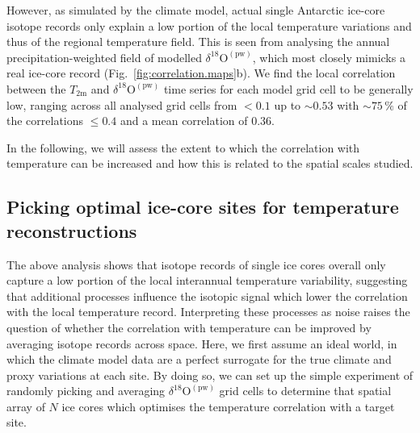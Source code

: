 \documentclass[cp, manuscript]{copernicus}
\begin{document}
However, as simulated by the climate model, actual single Antarctic ice-core
isotope records only explain a low portion of the local temperature variations
and thus of the regional temperature field. This is seen from analysing the
annual precipitation-weighted field of modelled
$\delta^{18}\mathrm{O}^{\mathrm{(pw)}}$, which most closely mimicks a real
ice-core record (Fig.~\ref{fig:correlation.maps}b). We find the local
correlation between the $T_{2\mathrm{m}}$ and
$\delta^{18}\mathrm{O}^{\mathrm{(pw)}}$ time series for each model grid cell to
be generally low, ranging across all analysed grid cells from $<0.1$ up to
$\sim0.53$ with $\sim75\,\%$ of the correlations $\leq0.4$ and a mean
correlation of $0.36$.

In the following, we will assess the extent to which the correlation with
temperature can be increased and how this is related to the spatial scales
studied.

\subsection{Picking optimal ice-core sites for temperature reconstructions}
\label{results:picking}

The above analysis shows that isotope records of single ice cores overall only
capture a low portion of the local interannual temperature variability,
suggesting that additional processes influence the isotopic signal which lower
the correlation with the local temperature record. Interpreting these processes
as noise raises the question of whether the correlation with temperature can be
improved by averaging isotope records across space. Here, we first assume an
ideal world, in which the climate model data are a perfect surrogate for the
true climate and proxy variations at each site. By doing so, we can set up the
simple experiment of randomly picking and averaging
$\delta^{18}\mathrm{O}^{\mathrm{(pw)}}$ grid cells to determine that spatial
array of $N$ ice cores which optimises the temperature correlation with a target
site.
\end{document}

